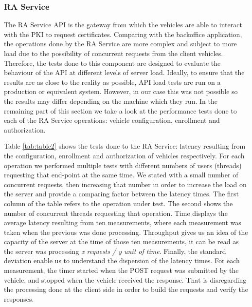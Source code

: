 \subsubsection{RA Service}

The RA Service API is the gateway from which the vehicles are able to interact with the PKI to request certificates. Comparing with the backoffice application, the operations done by the RA Service are more complex and subject to more load due to the possibility of concurrent requests from the client vehicles. Therefore, the tests done to this component are designed to evaluate the behaviour of the API at different levels of server load. Ideally, to ensure that the results are as close to the reality as possible, API load tests are run on a production or equivalent system. However, in our case this was not possible so the results may differ depending on the machine which they run. In the remaining part of this section we take a look at the performance tests done to each of the RA Service operations: vehicle configuration, enrollment and authorization.

Table \ref{tab:table2} shows the tests done to the RA Service: latency resulting from the configuration, enrollment and authorization of vehicles respectively. For each operation we performed multiple tests with different numbers of users (threads) requesting that end-point at the same time. We stated with a small number of concurrent requests, then increasing that number in order to increase the load on the server and provide a comparing factor between the latency times. The first column of the table refers to the operation under test. The second shows the number of concurrent threads requesting that operation. Time displays the average latency resulting from ten measurements, where each measurement was taken when the previous was done processing. Throughput gives us an idea of the capacity of the server at the time of those ten measurements, it can be read as the server was processing \textit{x requests / y unit of time}. Finally, the standard deviation enable us to understand the dispersion of the latency times. For each measurement, the timer started when the POST request was submitted by the vehicle, and stopped when the vehicle received the response. That is disregarding the processing done at the client side in order to build the requests and verify the responses. 


